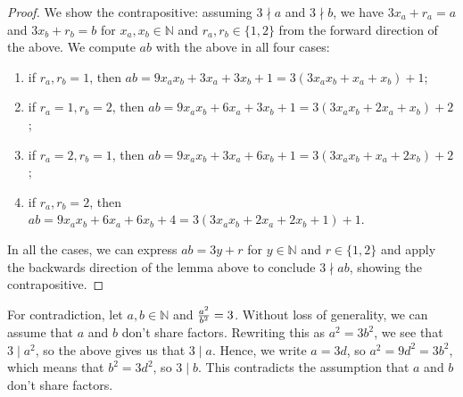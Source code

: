 \documentclass{article}
\newcommand{\N}{\mathbb{N}}
\begin{document}
\begin{proof}
We show the contrapositive: assuming $3 \nmid a$ and $3 \nmid b$, we have $3x_a + r_a = a$ and
$3x_b + r_b = b$ for $x_a, x_b \in \N$ and $r_a, r_b \in \{1, 2\}$ from the forward direction of the above.
We compute $ab$ with the above in all four cases:
\begin{enumerate}
    \item if $r_a, r_b = 1$, then $ab = 9 x_a x_b + 3 x_a + 3 x_b + 1 = 3(3 x_a x_b + x_a + x_b) + 1$;
    \item if $r_a = 1, r_b = 2$, then $ab = 9 x_a x_b + 6 x_a + 3 x_b + 1 = 3(3 x_a x_b + 2 x_a + x_b) + 2$;
    \item if $r_a = 2, r_b = 1$, then $ab = 9 x_a x_b + 3 x_a + 6 x_b + 1 = 3(3 x_a x_b + x_a + 2 x_b) + 2$;
    \item if $r_a, r_b = 2$, then $ab = 9 x_a x_b + 6 x_a + 6 x_b + 4 = 3(3 x_a x_b + 2 x_a + 2 x_b + 1) + 1$.
\end{enumerate}
In all the cases, we can express $ab = 3y + r$ for $y \in \N$ and $r \in \{1, 2\}$ and apply the backwards direction of
the lemma above to conclude $3 \nmid ab$, showing the contrapositive.
\end{proof}

For contradiction, let $a, b \in \N$ and ${a^2 \over b^2} = 3$. Without loss of generality, we can assume that $a$ and $b$ don't
share factors. Rewriting this as $a^2 = 3 b^2$, we see that $3 \mid a^2$, so the above gives us that $3 \mid a$.
Hence, we write $a = 3d$, so $a^2 = 9 d^2 = 3 b^2$, which means that $b^2 = 3 d^2$, so $3 \mid b$. This contradicts the assumption
that $a$ and $b$ don't share factors.
\end{document}
